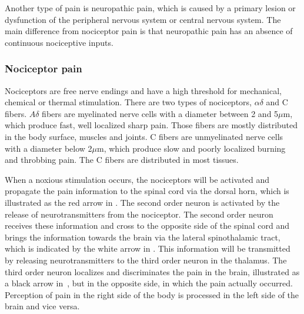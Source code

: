 Another type of pain is neuropathic pain, which is caused by a primary lesion or dysfunction of the peripheral nervous system or central nervous system. The main difference from nociceptor pain is that neuropathic pain has an absence of continuous nociceptive inputs. \cite{Kerstman2013}

\subsubsection{Nociceptor pain}
Nociceptors are free nerve endings and have a high threshold for mechanical, chemical or thermal stimulation. There are two types of nociceptors, $\alpha\delta$ and C fibers. $A\delta$ fibers are myelinated nerve cells with a diameter between 2 and 5$\mu$m, which produce fast, well localized sharp pain. Those fibers are mostly distributed in the body surface, muscles and joints. C fibers are unmyelinated nerve cells with a diameter below 2$\mu$m, which produce slow and poorly localized burning and throbbing pain. The C fibers are distributed in most tissues. \cite{Steeds2013}

When a noxious stimulation occurs, the nociceptors will be activated and propagate the pain information to the spinal cord via the dorsal horn, which is illustrated as the red arrow in . The second order neuron is activated by the release of neurotransmitters from the nociceptor. The second order neuron receives these information and cross  to the opposite side of the spinal cord and brings the information towards the brain via the lateral spinothalamic tract, which is indicated by the white arrow in . This information will be transmitted by releasing neurotransmitters to the third order neuron in the thalamus. The third order neuron localizes and discriminates the pain in the brain, illustrated as a black arrow in~, but in the opposite  side, in which the pain actually occurred. Perception of pain in the right side of the body is processed in the left side of the brain and vice versa. \cite{Martini2012} 



